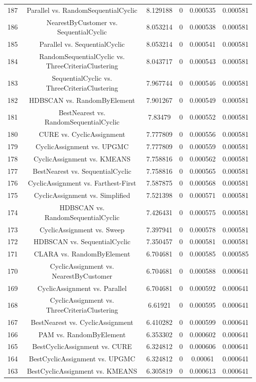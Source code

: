 \documentclass[a4paper,10pt]{article}
\begin{document}
\begin{landscape}
\begin{table}[!htp]
\begin{tabular}{cccccc}
187&Parallel vs. RandomSequentialCyclic&8.129188&0&0.000535&0.000581\\
186&NearestByCustomer vs. SequentialCyclic&8.053214&0&0.000538&0.000581\\
185&Parallel vs. SequentialCyclic&8.053214&0&0.000541&0.000581\\
184&RandomSequentialCyclic vs. ThreeCriteriaClustering&8.043717&0&0.000543&0.000581\\
183&SequentialCyclic vs. ThreeCriteriaClustering&7.967744&0&0.000546&0.000581\\
182&HDBSCAN vs. RandomByElement&7.901267&0&0.000549&0.000581\\
181&BestNearest vs. RandomSequentialCyclic&7.83479&0&0.000552&0.000581\\
180&CURE vs. CyclicAssignment&7.777809&0&0.000556&0.000581\\
179&CyclicAssignment vs. UPGMC&7.777809&0&0.000559&0.000581\\
178&CyclicAssignment vs. KMEANS&7.758816&0&0.000562&0.000581\\
177&BestNearest vs. SequentialCyclic&7.758816&0&0.000565&0.000581\\
176&CyclicAssignment vs. Farthest-First&7.587875&0&0.000568&0.000581\\
175&CyclicAssignment vs. Simplified&7.521398&0&0.000571&0.000581\\
174&HDBSCAN vs. RandomSequentialCyclic&7.426431&0&0.000575&0.000581\\
173&CyclicAssignment vs. Sweep&7.397941&0&0.000578&0.000581\\
172&HDBSCAN vs. SequentialCyclic&7.350457&0&0.000581&0.000581\\
171&CLARA vs. RandomByElement&6.704681&0&0.000585&0.000585\\
170&CyclicAssignment vs. NearestByCustomer&6.704681&0&0.000588&0.000641\\
169&CyclicAssignment vs. Parallel&6.704681&0&0.000592&0.000641\\
168&CyclicAssignment vs. ThreeCriteriaClustering&6.61921&0&0.000595&0.000641\\
167&BestNearest vs. CyclicAssignment&6.410282&0&0.000599&0.000641\\
166&PAM vs. RandomByElement&6.353302&0&0.000602&0.000641\\
165&BestCyclicAssignment vs. CURE&6.324812&0&0.000606&0.000641\\
164&BestCyclicAssignment vs. UPGMC&6.324812&0&0.00061&0.000641\\
163&BestCyclicAssignment vs. KMEANS&6.305819&0&0.000613&0.000641\\

\end{tabular}
\end{table}
\end{landscape}
\end{document}
